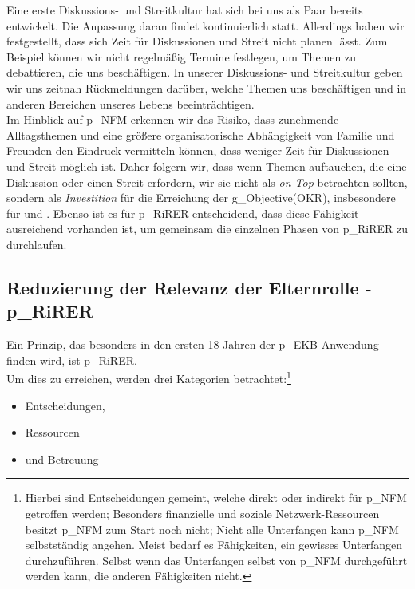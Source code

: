 Eine erste Diskussions- und Streitkultur hat sich bei uns als Paar bereits entwickelt. Die Anpassung daran findet kontinuierlich statt. Allerdings haben wir festgestellt, dass sich Zeit für Diskussionen und Streit nicht planen lässt. Zum Beispiel können wir nicht regelmäßig Termine festlegen, um Themen zu debattieren, die uns beschäftigen. In unserer Diskussions- und Streitkultur geben wir uns zeitnah Rückmeldungen darüber, welche Themen uns beschäftigen und in anderen Bereichen unseres Lebens beeinträchtigen.\\


Im Hinblick auf \gls{p_NFM} erkennen wir das Risiko, dass zunehmende Alltagsthemen und eine größere organisatorische Abhängigkeit von Familie und Freunden den Eindruck vermitteln können, dass weniger Zeit für Diskussionen und Streit möglich ist. Daher folgern wir, dass wenn Themen auftauchen, die eine Diskussion oder einen Streit erfordern, wir sie nicht als \textit{on-Top} betrachten sollten, sondern als \textit{Investition} für die Erreichung der \gls{g_Objective(OKR)}, insbesondere für \NFMOOne und \NFMOThree. Ebenso ist es für \gls{p_RiRER} entscheidend, dass diese Fähigkeit ausreichend vorhanden ist, um gemeinsam die einzelnen Phasen von \gls{p_RiRER} zu durchlaufen.
\subsection{Reduzierung der Relevanz der Elternrolle - \gls{p_RiRER}}

Ein Prinzip, das besonders in den ersten 18 Jahren der \gls{p_EKB} Anwendung finden wird, ist \gls{p_RiRER}.\\


Um dies zu erreichen, werden drei Kategorien betrachtet:\footnote{
	Hierbei sind Entscheidungen gemeint, welche direkt oder indirekt für \gls{p_NFM} getroffen werden; Besonders finanzielle und soziale Netzwerk-Ressourcen besitzt \gls{p_NFM} zum Start noch nicht; Nicht alle Unterfangen kann \gls{p_NFM} selbstständig angehen. Meist bedarf es Fähigkeiten, ein gewisses Unterfangen durchzuführen. Selbst wenn das Unterfangen selbst von \gls{p_NFM} durchgeführt werden kann, die anderen Fähigkeiten nicht.
} 
\begin{itemize}
	\item Entscheidungen,
	\item Ressourcen
	\item und Betreuung
\end{itemize}

